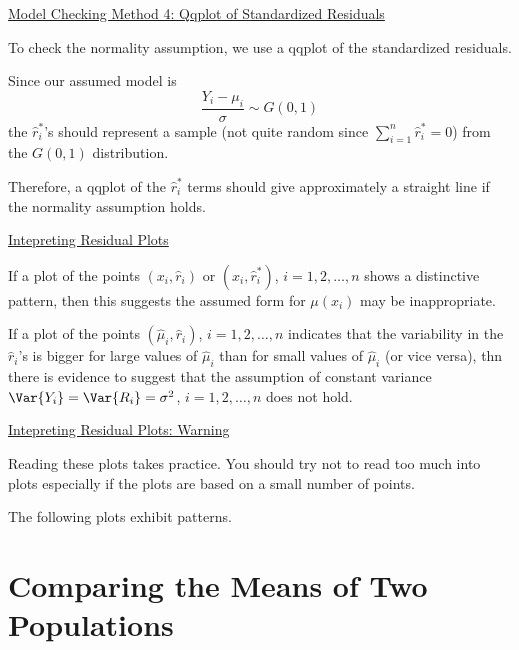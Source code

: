 \documentclass[oneside]{book}
\begin{document}
\underline{Model Checking Method 4: Qqplot of Standardized Residuals}

To check the normality assumption, we use a qqplot of the standardized residuals.

Since our assumed model is
\[ \frac{Y_i-\mu_i}{\sigma}\sim G(0,1)  \]
the $ \hat{r}_i^* $'s should represent a sample (not quite random since $ \sum\limits_{i=1}^{n} \hat{r}_i^* =0 $)
from the $ G(0,1) $ distribution.

Therefore, a qqplot of the $ \hat{r}_i^* $ terms should give approximately a straight line if the normality
assumption holds.

\underline{Intepreting Residual Plots}

If a plot of the points $ (x_i,\hat{r}_i) $ or $ (x_i,\hat{r}_i^*) $, $ i=1,2,\ldots ,n $
shows a distinctive pattern, then this suggests the assumed form for $ \mu(x_i) $ may be inappropriate.

If a plot of the points $ \left( \hat{\mu}_i,\hat{r}_i \right) $, $ i=1,2,\ldots ,n $
indicates that the variability in the $ \hat{r}_i $'s is bigger for large values of $ \hat{\mu}_i $
than for small values of $ \hat{\mu}_i $ (or vice versa), thn there is evidence to suggest
that the assumption of constant variance $ \Var{Y_i}=\Var{R_i}=\sigma^2 $, $ i=1,2,\ldots ,n $
does not hold.

\underline{Intepreting Residual Plots: Warning}

Reading these plots takes practice. You should try not to read too much into plots especially
if the plots are based on a small number of points.

The following plots exhibit patterns.

\section{Comparing the Means of Two Populations}
\end{document}
